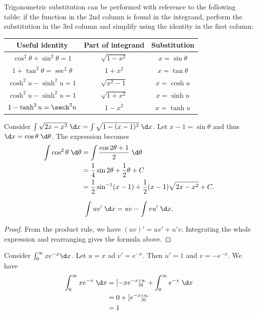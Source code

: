 \documentclass[a4paper]{article}
\begin{document}
Trigonometric substitution can be performed with reference to the following table: if the function in the 2nd column is found in the integrand, perform the substitution in the 3rd column and simplify using the identity in the first column:
\begin{center}
  \begin{tabular}{ccc}
    \toprule
    Useful identity                   & Part of integrand & Substitution      \\
    \midrule
    $\cos^2\theta + \sin^2\theta = 1$ & $\sqrt{1 - x^2}$  & $x = \sin \theta$ \\
    $1 + \tan^2\theta = \sec^2\theta$ & $1 + x^2$         & $x = \tan\theta$  \\
    $\cosh^2u - \sinh^2 u = 1$        & $\sqrt{x^2 - 1}$  & $x=\cosh u$       \\
    $\cosh^2u - \sinh^2 u = 1$        & $\sqrt{1 + x^2}$  & $x=\sinh u$       \\
    $1 - \tanh^2 u = \sech^2u$        & $1 - x^2$         & $x = \tanh u$     \\
    \bottomrule
  \end{tabular}
\end{center}
\begin{eg}
  Consider $\int \sqrt{2x - x^2}\;\d x = \int\sqrt{1 - (x - 1)^2}\;\d x$. Let $x - 1=\sin\theta$ and thus $\d x = \cos \theta\;\d\theta$. The expression becomes
  \begin{align*}
    \int \cos^2\theta \;\d \theta &= \int\frac{\cos 2\theta + 1}{2}\;\d \theta\\
    &= \frac{1}{4}\sin 2\theta + \frac{1}{2}\theta + C\\
    &= \frac{1}{2}\sin^{-1}(x - 1) + \frac{1}{2}(x - 1)\sqrt{2x - x^2} + C.
  \end{align*}
\end{eg}

\begin{thm}
  \[
    \int uv'\;\d x = uv - \int vu' \;\d x.
  \]
\end{thm}

\begin{proof}
  From the product rule, we have $(uv)' = uv' + u'v$. Integrating the whole expression and rearranging gives the formula above.
\end{proof}

\begin{eg}
  Consider $\int_0^\infty xe^{-x}\d x$. Let $u = x$ ad $v' = e^{-x}$. Then $u' = 1$ and $v = -e^{-x}$. We have
  \begin{align*}
    \int_0^\infty xe^{-x}\;\d x &= [-xe^{-x}]^\infty_0 + \int_0^\infty e^{-x} \;\d x\\
    &= 0 + [e^{-x}]_0^\infty\\
    &= 1
  \end{align*}
\end{eg}
\end{document}
